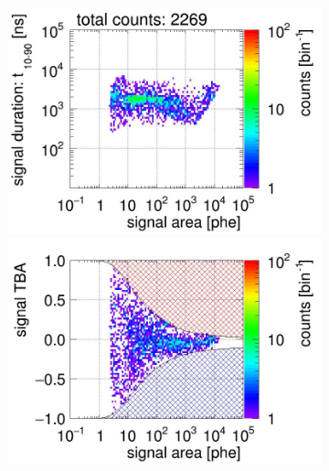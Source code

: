 \begin{landscape}
\begin{figure}[!p]
\begin{subfigure}[t]{0.33\textwidth}
			\caption{}
			\label{fig:signal selection 08}
		\end{subfigure}
		\begin{subfigure}[t]{0.33\textwidth}
			\centering
			\includegraphics[width=\figurewidth,clip,trim={0 98 0 0}]{Figures/GasTest/CutsValid/res64767/pdpa09Vecfig64767.jpg}
			\includegraphics[width=\figurewidth,clip,trim={0 98 0 40}]{Figures/GasTest/CutsValid/res64767/tbapa09Vecfig64767.jpg}

\end{subfigure}
\end{figure}
\end{landscape}
